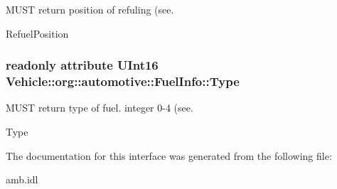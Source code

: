 M\-U\-S\-T return position of refuling (see. 

Refuel\-Position \hypertarget{interfaceVehicle_1_1org_1_1automotive_1_1FuelInfo_a8c6fd4e9e6e87441b5bef2567edcfb6d}{
\subsubsection[{Type}]{\setlength{\rightskip}{0pt plus 5cm}readonly attribute U\-Int16 Vehicle\-::org\-::automotive\-::\-Fuel\-Info\-::\-Type}}\label{interfaceVehicle_1_1org_1_1automotive_1_1FuelInfo_a8c6fd4e9e6e87441b5bef2567edcfb6d}


M\-U\-S\-T return type of fuel. integer 0-\/4 (see. 

Type 

The documentation for this interface was generated from the following file\-:\begin{DoxyCompactItemize}
\item 
amb.\-idl\end{DoxyCompactItemize}
